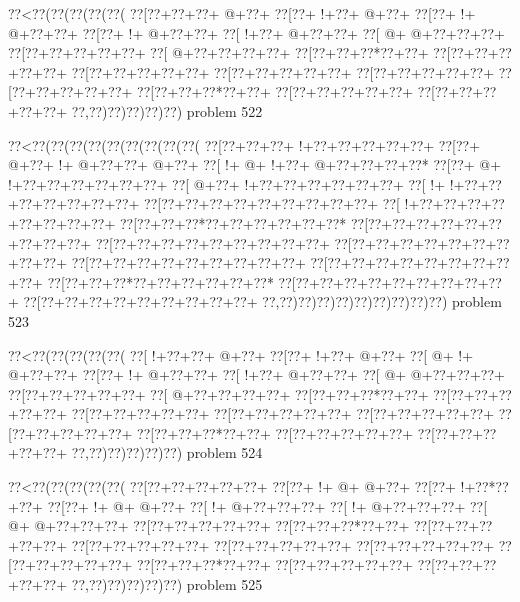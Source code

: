 \vbox{\vbox{\goo
\0??<\0??(\0??(\0??(\0??(\0??(
\0??[\0??+\0??+\0??+\- @+\0??+
\0??[\0??+\- !+\0??+\- @+\0??+
\0??[\0??+\- !+\- @+\0??+\0??+
\0??[\0??+\- !+\- @+\0??+\0??+
\0??[\- !+\0??+\- @+\0??+\0??+
\0??[\- @+\- @+\0??+\0??+\0??+
\0??[\0??+\0??+\0??+\0??+\0??+
\0??[\- @+\0??+\0??+\0??+\0??+
\0??[\0??+\0??+\0??*\0??+\0??+
\0??[\0??+\0??+\0??+\0??+\0??+
\0??[\0??+\0??+\0??+\0??+\0??+
\0??[\0??+\0??+\0??+\0??+\0??+
\0??[\0??+\0??+\0??+\0??+\0??+
\0??[\0??+\0??+\0??+\0??+\0??+
\0??[\0??+\0??+\0??*\0??+\0??+
\0??[\0??+\0??+\0??+\0??+\0??+
\0??[\0??+\0??+\0??+\0??+\0??+
\0??,\0??)\0??)\0??)\0??)\0??)
}
\hfil problem 522\hfil\break
}

\vbox{\vbox{\goo
\0??<\0??(\0??(\0??(\0??(\0??(\0??(\0??(\0??(\0??(
\0??[\0??+\0??+\0??+\- !+\0??+\0??+\0??+\0??+\0??+
\0??[\0??+\- @+\0??+\- !+\- @+\0??+\0??+\- @+\0??+
\0??[\- !+\- @+\- !+\0??+\- @+\0??+\0??+\0??+\0??*
\0??[\0??+\- @+\- !+\0??+\0??+\0??+\0??+\0??+\0??+
\0??[\- @+\0??+\- !+\0??+\0??+\0??+\0??+\0??+\0??+
\0??[\- !+\- !+\0??+\0??+\0??+\0??+\0??+\0??+\0??+
\0??[\0??+\0??+\0??+\0??+\0??+\0??+\0??+\0??+\0??+
\0??[\- !+\0??+\0??+\0??+\0??+\0??+\0??+\0??+\0??+
\0??[\0??+\0??+\0??*\0??+\0??+\0??+\0??+\0??+\0??*
\0??[\0??+\0??+\0??+\0??+\0??+\0??+\0??+\0??+\0??+
\0??[\0??+\0??+\0??+\0??+\0??+\0??+\0??+\0??+\0??+
\0??[\0??+\0??+\0??+\0??+\0??+\0??+\0??+\0??+\0??+
\0??[\0??+\0??+\0??+\0??+\0??+\0??+\0??+\0??+\0??+
\0??[\0??+\0??+\0??+\0??+\0??+\0??+\0??+\0??+\0??+
\0??[\0??+\0??+\0??*\0??+\0??+\0??+\0??+\0??+\0??*
\0??[\0??+\0??+\0??+\0??+\0??+\0??+\0??+\0??+\0??+
\0??[\0??+\0??+\0??+\0??+\0??+\0??+\0??+\0??+\0??+
\0??,\0??)\0??)\0??)\0??)\0??)\0??)\0??)\0??)\0??)
}
\hfil problem 523\hfil\break
}

\vbox{\vbox{\goo
\0??<\0??(\0??(\0??(\0??(\0??(
\0??[\- !+\0??+\0??+\- @+\0??+
\0??[\0??+\- !+\0??+\- @+\0??+
\0??[\- @+\- !+\- @+\0??+\0??+
\0??[\0??+\- !+\- @+\0??+\0??+
\0??[\- !+\0??+\- @+\0??+\0??+
\0??[\- @+\- @+\0??+\0??+\0??+
\0??[\0??+\0??+\0??+\0??+\0??+
\0??[\- @+\0??+\0??+\0??+\0??+
\0??[\0??+\0??+\0??*\0??+\0??+
\0??[\0??+\0??+\0??+\0??+\0??+
\0??[\0??+\0??+\0??+\0??+\0??+
\0??[\0??+\0??+\0??+\0??+\0??+
\0??[\0??+\0??+\0??+\0??+\0??+
\0??[\0??+\0??+\0??+\0??+\0??+
\0??[\0??+\0??+\0??*\0??+\0??+
\0??[\0??+\0??+\0??+\0??+\0??+
\0??[\0??+\0??+\0??+\0??+\0??+
\0??,\0??)\0??)\0??)\0??)\0??)
}
\hfil problem 524\hfil\break
}

\vbox{\vbox{\goo
\0??<\0??(\0??(\0??(\0??(\0??(
\0??[\0??+\0??+\0??+\0??+\0??+
\0??[\0??+\- !+\- @+\- @+\0??+
\0??[\0??+\- !+\0??*\0??+\0??+
\0??[\0??+\- !+\- @+\- @+\0??+
\0??[\- !+\- @+\0??+\0??+\0??+
\0??[\- !+\- @+\0??+\0??+\0??+
\0??[\- @+\- @+\0??+\0??+\0??+
\0??[\0??+\0??+\0??+\0??+\0??+
\0??[\0??+\0??+\0??*\0??+\0??+
\0??[\0??+\0??+\0??+\0??+\0??+
\0??[\0??+\0??+\0??+\0??+\0??+
\0??[\0??+\0??+\0??+\0??+\0??+
\0??[\0??+\0??+\0??+\0??+\0??+
\0??[\0??+\0??+\0??+\0??+\0??+
\0??[\0??+\0??+\0??*\0??+\0??+
\0??[\0??+\0??+\0??+\0??+\0??+
\0??[\0??+\0??+\0??+\0??+\0??+
\0??,\0??)\0??)\0??)\0??)\0??)
}
\hfil problem 525\hfil\break
}


